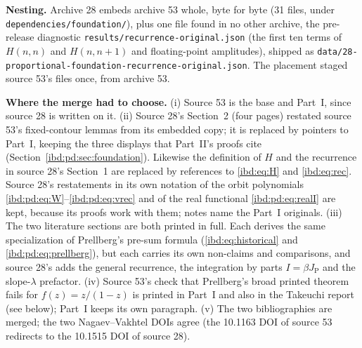 \documentclass[11pt,letterpaper]{article}
\theoremstyle{remark}\newtheorem{remark}[theorem]{Remark}
\newcommand{\JP}{J_{\mathrm P}}
\newcommand{\repopath}[1]{\nolinkurl{#1}}
\begin{document}
\noindent\textbf{Nesting.} Archive 28 embeds archive 53 whole, byte for byte (31 files, under \repopath{dependencies/foundation/}), plus one file found in no other archive, the pre-release diagnostic \repopath{results/recurrence-original.json} (the first ten terms of $H(n,n)$ and $H(n,n+1)$ and floating-point amplitudes), shipped as \repopath{data/28-proportional-foundation-recurrence-original.json}. The placement staged source 53's files once, from archive 53.

\noindent\textbf{Where the merge had to choose.}
(i) Source 53 is the base and Part~I, since source 28 is written on it.
(ii) Source 28's Section~2 (four pages) restated source 53's fixed-contour lemmas from its embedded copy; it is replaced by pointers to Part~I, keeping the three displays that Part~II's proofs cite (Section~\ref{ibd:pd:sec:foundation}). Likewise the definition of $H$ and the recurrence in source 28's Section~1 are replaced by references to \eqref{ibd:eq:H} and \eqref{ibd:eq:rec}. Source 28's restatements in its own notation of the orbit polynomials \eqref{ibd:pd:eq:W}--\eqref{ibd:pd:eq:vrec} and of the real functional \eqref{ibd:pd:eq:realI} are kept, because its proofs work with them; notes name the Part~I originals.
(iii) The two literature sections are both printed in full. Each derives the same specialization of Prellberg's pre-sum formula (\eqref{ibd:eq:historical} and \eqref{ibd:pd:eq:prellberg}), but each carries its own non-claims and comparisons, and source 28's adds the general recurrence, the integration by parts $I=\beta\JP$ and the slope-$\lambda$ prefactor.
(iv) Source 53's check that Prellberg's broad printed theorem fails for $f(z)=z/(1-z)$ is printed in Part~I and also in the Takeuchi report (see below); Part~I keeps its own paragraph.
(v) The two bibliographies are merged; the two Nagaev--Vakhtel DOIs agree (the 10.1163 DOI of source 53 redirects to the 10.1515 DOI of source 28).
\end{document}
